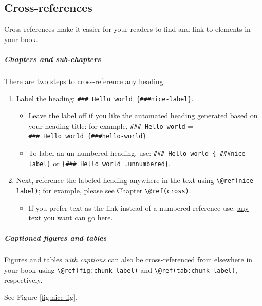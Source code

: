 \documentclass[
]{book}
\providecommand{\tightlist}{%
  \setlength{\itemsep}{0pt}\setlength{\parskip}{0pt}}
\begin{document}
{{{{\subsection{Cross-references}\label{cross-references}}

Cross-references make it easier for your readers to find and link to elements in your book.

\hypertarget{chapters-and-sub-chapters}{%
\subparagraph{Chapters and sub-chapters}\label{chapters-and-sub-chapters}}

There are two steps to cross-reference any heading:

\begin{enumerate}
\def\labelenumi{\arabic{enumi}.}
\tightlist
\item
  Label the heading: \texttt{\#\#\#\ Hello\ world\ \{\#\#\#nice-label\}}.

  \begin{itemize}
  \tightlist
  \item
    Leave the label off if you like the automated heading generated based on your heading title: for example, \texttt{\#\#\#\ Hello\ world} = \texttt{\#\#\#\ Hello\ world\ \{\#\#\#hello-world\}}.
  \item
    To label an un-numbered heading, use: \texttt{\#\#\#\ Hello\ world\ \{-\#\#\#nice-label\}} or \texttt{\{\#\#\#\ Hello\ world\ .unnumbered\}}.
  \end{itemize}
\item
  Next, reference the labeled heading anywhere in the text using \texttt{\textbackslash{}@ref(nice-label)}; for example, please see Chapter \texttt{\textbackslash{}@ref(cross)}.

  \begin{itemize}
  \tightlist
  \item
    If you prefer text as the link instead of a numbered reference use: \protect\hyperlink{ux5cux23ux5cux23cross}{any text you want can go here}.
  \end{itemize}
\end{enumerate}

\hypertarget{captioned-figures-and-tables}{%
\subparagraph{Captioned figures and tables}\label{captioned-figures-and-tables}}

Figures and tables \emph{with captions} can also be cross-referenced from elsewhere in your book using \texttt{\textbackslash{}@ref(fig:chunk-label)} and \texttt{\textbackslash{}@ref(tab:chunk-label)}, respectively.

See Figure \ref{fig:nice-fig}.

}}}
\end{document}
